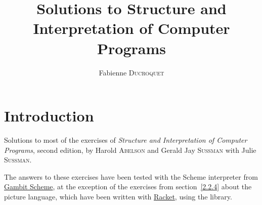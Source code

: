 \documentclass{scrreprt}
\title{Solutions to Structure and Interpretation of Computer Programs}
\author{Fabienne \textsc{Ducroquet}}
\newcounter{mitpage}
\let\oldchapter\chapter
\renewcommand\chapter{\stepcounter{mitpage}\oldchapter}
\theoremstyle{example}
\theoremstyle{remark}
\theoremstyle{comp}
\theoremstyle{sicp-exe}
\begin{document}
\maketitle

\tableofcontents

\chapter*{Introduction}

Solutions to most of the exercises of \emph{Structure and Interpretation of 
Computer Programs}, second edition, by Harold \textsc{Abelson} and Gerald Jay 
\textsc{Sussman} with Julie \textsc{Sussman}.

The answers to these exercises have been tested with the Scheme interpreter from 
\href{http://gambitscheme.org}{Gambit Scheme}, at the exception of the exercises 
from section~\ref{2.2.4} about the picture language, which have been written 
with \href{http://racket-lang.org}{Racket}, using the  
library.






\end{document}
